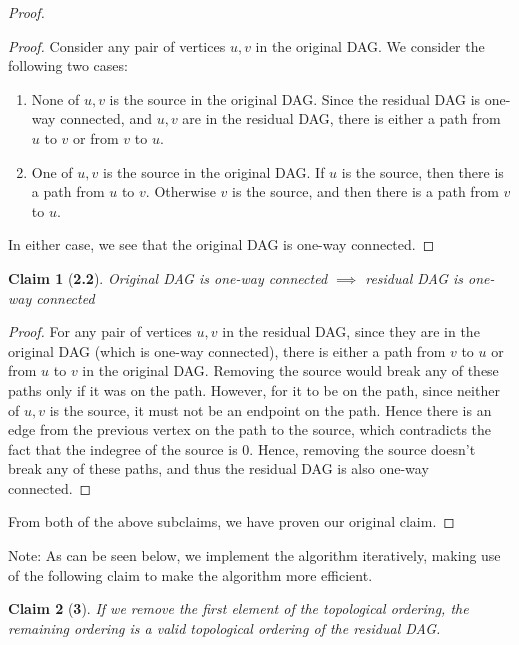 \documentclass[answers]{exam}
\newtheorem*{claim}{Claim}
\begin{document}
\begin{questions}
\begin{solution}
\begin{proof}
\begin{proof}
Consider any pair of vertices $u, v$ in the original DAG. We consider the following two cases:
\begin{enumerate}
    \item None of $u, v$ is the source in the original DAG. Since the residual DAG is one-way connected, and $u, v$ are in the residual DAG, there is either a path from $u$ to $v$ or from $v$ to $u$.
    \item One of $u, v$ is the source in the original DAG. If $u$ is the source, then there is a path from $u$ to $v$. Otherwise $v$ is the source, and then there is a path from $v$ to $u$.
\end{enumerate}
In either case, we see that the original DAG is one-way connected.
\end{proof}

\begin{claim}[\textbf{2.2}] Original DAG is one-way connected $\implies$ residual DAG is one-way connected
\end{claim}

\begin{proof}
For any pair of vertices $u, v$ in the residual DAG, since they are in the original DAG (which is one-way connected), there is either a path from $v$ to $u$ or from $u$ to $v$ in the original DAG. Removing the source would break any of these paths only if it was on the path. However, for it to be on the path, since neither of $u, v$ is the source, it must not be an endpoint on the path. Hence there is an edge from the previous vertex on the path to the source, which contradicts the fact that the indegree of the source is $0$. Hence, removing the source doesn't break any of these paths, and thus the residual DAG is also one-way connected.
\end{proof}

From both of the above subclaims, we have proven our original claim.
\end{proof}

Note: As can be seen below, we implement the algorithm iteratively, making use of the following claim to make the algorithm more efficient.

\begin{claim}[\textbf{3}]
If we remove the first element of the topological ordering, the remaining ordering is a valid topological ordering of the residual DAG.
\end{claim}


\end{solution}
\end{questions}
\end{document}
